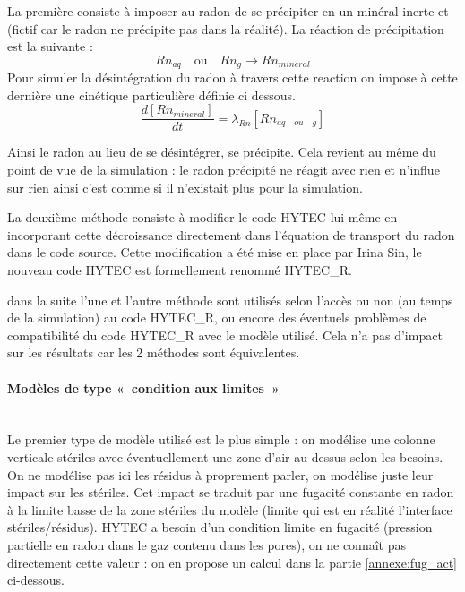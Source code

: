 \documentclass{article}
\begin{document}
La première consiste à imposer au radon de se précipiter en un minéral inerte et (fictif car le radon ne précipite pas dans la réalité). La réaction de précipitation est la suivante :
$$Rn_{aq} \quad \text{ou} \quad Rn_{g} \rightarrow Rn_{mineral}$$
Pour simuler la désintégration du radon à travers cette reaction on impose à cette dernière une cinétique particulière définie ci dessous. 
$$ \frac{d\left[ Rn_{mineral} \right]}{dt}=\lambda_{Rn} \left[ Rn_{aq \quad ou \quad g} \right] $$

Ainsi le radon au lieu de se désintégrer, se précipite. Cela revient au même du point de vue de la simulation : le radon précipité ne réagit avec rien et n'influe sur rien ainsi c'est comme si il n'existait plus pour la simulation.

La deuxième méthode consiste à modifier le code HYTEC lui même en incorporant cette décroissance directement dans l'équation de transport du radon dans le code source. Cette modification a été mise en place par Irina Sin, le nouveau code HYTEC est formellement renommé HYTEC\_R.

dans la suite l'une et l'autre méthode sont utilisés selon l'accès ou non (au temps de la simulation) au code HYTEC\_R, ou encore des éventuels problèmes de compatibilité du code HYTEC\_R avec le modèle utilisé. Cela n'a pas d'impact sur les résultats car les 2 méthodes sont équivalentes.

\paragraph{Modèles de type « condition aux limites » \\ \\} Le premier type de modèle utilisé est le plus simple : on modélise une colonne verticale stériles avec éventuellement une zone d'air au dessus selon les besoins. On ne modélise pas ici les résidus à proprement parler, on modélise juste leur impact sur les stériles. Cet impact se traduit par une fugacité constante en radon à la limite basse de la zone stériles du modèle (limite qui est en réalité l'interface stériles/résidus). HYTEC a besoin d'un condition limite en fugacité (pression partielle en radon dans le gaz contenu dans les pores), on ne connaît pas directement cette valeur : on en propose un calcul dans la partie \ref{annexe:fug_act} ci-dessous.
\end{document}
